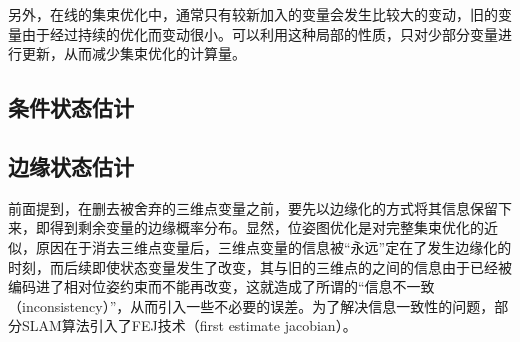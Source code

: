 另外，在线的集束优化中，通常只有较新加入的变量会发生比较大的变动，旧的变量由于经过持续的优化而变动很小。可以利用这种局部的性质，只对少部分变量进行更新，从而减少集束优化的计算量。

\subsection{条件状态估计}

\subsection{边缘状态估计}

前面提到，在删去被舍弃的三维点变量之前，要先以边缘化的方式将其信息保留下来，即得到剩余变量的边缘概率分布。显然，位姿图优化是对完整集束优化的近似，原因在于消去三维点变量后，三维点变量的信息被“永远”定在了发生边缘化的时刻，而后续即使状态变量发生了改变，其与旧的三维点的之间的信息由于已经被编码进了相对位姿约束而不能再改变，这就造成了所谓的“信息不一致（inconsistency）”，从而引入一些不必要的误差。为了解决信息一致性的问题，部分SLAM算法引入了FEJ技术（first estimate jacobian）\citep{huang2008analysis,li2012improving}。
